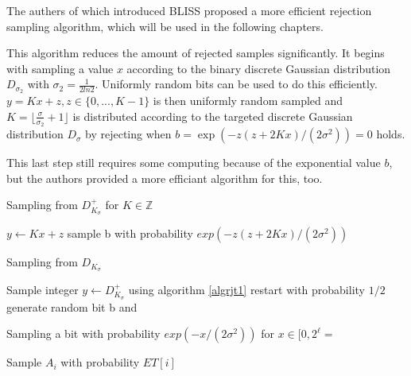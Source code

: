 The authers of \cite{bliss} which introduced BLISS proposed a more efficient rejection sampling algorithm, which will be used in the following chapters.%

This algorithm reduces the amount of rejected samples significantly. It begins with sampling a value $x$ according to the binary discrete Gaussian distribution $D_{\sigma 	_{2}}$ with $\sigma _2 = \frac{1}{2 ln 2}$. Uniformly random bits can be used to do this efficiently. $y = Kx + z, z \in \{0,...,K-1\}$ is then uniformly random sampled and $K = \lfloor\frac{\sigma}{\sigma _2} + 1\rfloor$ is distributed according to the targeted discrete Gaussian distribution $D_\sigma$ by rejecting when $b = \exp (−z(z + 2Kx)/(2σ^2)) = 0$ holds.

This last step still requires some computing because of the exponential value $b$, but the authors provided a more efficiant algorithm for this, too. %
 \begin{algorithm}
 	\caption{Sampling from $D^+_{K_{\sigma}}$ for $K\in\mathbb{Z}$}
 	\label{algrjt1}
 	\begin{algorithmic}[1]
 		\State $y \leftarrow Kx + z$
 		\State sample b with probability $exp(-z(z+2Kx)/(2\sigma^2))$
	 		\State
 		\EndIf	
 	\end{algorithmic}
 \end{algorithm}
 \begin{algorithm}
 	\caption{Sampling from $D_{K_{\sigma}}$}
 	\label{algrjt2}
 	\begin{algorithmic}[1]
 		\State Sample integer $y \leftarrow D^+_{K_{\sigma}}$ using algorithm \ref{algrjt1}
	 		\State restart with probability $1/2$
	 	\EndIf
	 	\State generate random bit b and 
 	\end{algorithmic}
 \end{algorithm}
  \begin{algorithm}
  	\caption{Sampling a bit with probability $exp(-x/(2\sigma^2))$ for $x \in [0, 2^\ell=$}
  	\label{algrjt3}
  	\begin{algorithmic}[1]
  	 \Require{$x \in [0,2^\ell)$ an integer in binary form $x = x_{\ell-1}...x_0$. Table $ET$ with precomputed values $ET[i] = exp(-x/(2\sigma^2))$ for $0 \le i \le \ell-1$}
		  	 \State Sample $A_i$ with probability $ET[i]$
		  	  
		  	 \EndIf
		 \EndIf
	 \EndFor
	 \State
  	\end{algorithmic}
  \end{algorithm}

